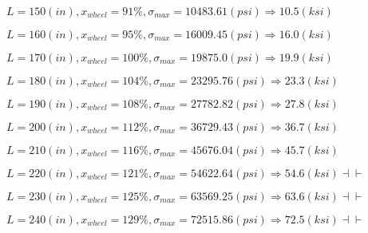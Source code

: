 \documentclass[11pt]{article}
\newcommand{\prompt}[4]{
        {\ttfamily\llap{{\color{#2}[#3]:\hspace{3pt}#4}}\vspace{-\baselineskip}}
    }
\begin{document}
    
 
            
\prompt{Out}{outcolor}{12}{}
    
    $L= 150(in), x_{wheel}=91 \%, \sigma_{max}=10483.61(psi) \Rightarrow 10.5(ksi)$

    
 
            
\prompt{Out}{outcolor}{12}{}
    
    $L= 160(in), x_{wheel}=95 \%, \sigma_{max}=16009.45(psi) \Rightarrow 16.0(ksi)$

    
 
            
\prompt{Out}{outcolor}{12}{}
    
    $L= 170(in), x_{wheel}=100 \%, \sigma_{max}=19875.0(psi) \Rightarrow 19.9(ksi)$

    
 
            
\prompt{Out}{outcolor}{12}{}
    
    $L= 180(in), x_{wheel}=104 \%, \sigma_{max}=23295.76(psi) \Rightarrow 23.3(ksi)$

    
 
            
\prompt{Out}{outcolor}{12}{}
    
    $L= 190(in), x_{wheel}=108 \%, \sigma_{max}=27782.82(psi) \Rightarrow 27.8(ksi)$

    
 
            
\prompt{Out}{outcolor}{12}{}
    
    $L= 200(in), x_{wheel}=112 \%, \sigma_{max}=36729.43(psi) \Rightarrow 36.7(ksi)$

    
 
            
\prompt{Out}{outcolor}{12}{}
    
    $L= 210(in), x_{wheel}=116 \%, \sigma_{max}=45676.04(psi) \Rightarrow 45.7(ksi)$

    
 
            
\prompt{Out}{outcolor}{12}{}
    
    $L= 220(in), x_{wheel}=121 \%, \sigma_{max}=54622.64(psi) \Rightarrow 54.6(ksi)\dashv \vdash$

    
 
            
\prompt{Out}{outcolor}{12}{}
    
    $L= 230(in), x_{wheel}=125 \%, \sigma_{max}=63569.25(psi) \Rightarrow 63.6(ksi)\dashv \vdash$

    
 
            
\prompt{Out}{outcolor}{12}{}
    
    $L= 240(in), x_{wheel}=129 \%, \sigma_{max}=72515.86(psi) \Rightarrow 72.5(ksi)\dashv \vdash$
\end{document}
